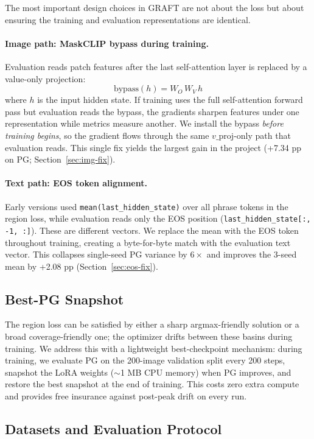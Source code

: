 \documentclass{article}
\begin{document}
The most important design choices in GRAFT are not about the loss but about
ensuring the training and evaluation representations are identical.

\paragraph{Image path: MaskCLIP bypass during training.}
Evaluation reads patch features after the last self-attention layer is replaced
by a value-only projection:
\[
\text{bypass}(h) = W_O \, W_V \, h
\]
where $h$ is the input hidden state.  If training uses the full self-attention
forward pass but evaluation reads the bypass, the gradients sharpen features
under one representation while metrics measure another. We install the bypass
\emph{before training begins}, so the gradient flows through the same
$v\_\text{proj}$-only path that evaluation reads.  This single fix yields the
largest gain in the project (+7.34 pp on PG; Section~\ref{sec:img-fix}).

\paragraph{Text path: EOS token alignment.}
Early versions used \texttt{mean(last\_hidden\_state)} over all phrase tokens
in the region loss, while evaluation reads only the EOS position
(\texttt{last\_hidden\_state[:, -1, :]}). These are different vectors. We
replace the mean with the EOS token throughout training, creating a
byte-for-byte match with the evaluation text vector. This collapses
single-seed PG variance by $6\times$ and improves the 3-seed mean by +2.08 pp
(Section~\ref{sec:eos-fix}).

\subsection{Best-PG Snapshot}
\label{sec:snapshot}

The region loss can be satisfied by either a sharp argmax-friendly solution or
a broad coverage-friendly one; the optimizer drifts between these basins during
training. We address this with a lightweight best-checkpoint mechanism: during
training, we evaluate PG on the 200-image validation split every 200 steps,
snapshot the LoRA weights ($\sim$1 MB CPU memory) when PG improves, and
restore the best snapshot at the end of training. This costs zero extra compute
and provides free insurance against post-peak drift on every run.

\subsection{Datasets and Evaluation Protocol}
\label{sec:data}
\end{document}
